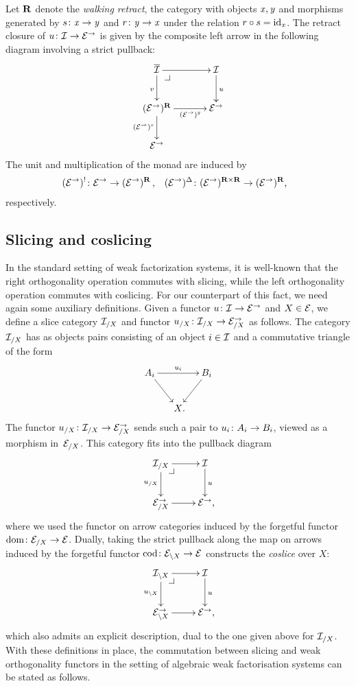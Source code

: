 \documentclass[reqno,10pt,a4paper,oneside,draft]{amsart}
\begin{document}
\begin{remark}
Let $\ret$ denote the \emph{walking retract}, \ie the category with objects $\retA, \retB$ and morphisms generated by $s \co \retA \to \retB$ and $r \co \retB \to \retA$ under the relation $r \cc s = \id_{\retA}$.
The retract closure of $u \co \cal{I} \to \catE^\to$ is given by the composite left arrow in the following diagram involving a strict pullback:
\[
\xymatrix@C+1em{
  \overline{\cal{I}}
  \ar[r]
  \ar[d]_v
  \pullback{dr}
&
  \cal{I}
  \ar[d]^{u}
\\
  (\catE^\to)^{\ret}
  \ar[r]_-{(\catE^\to)^{\retB}}
  \ar[d]_{(\catE^\to)^\retA}
&
  \catE^\to
\\
  \catE^\to
}
\]
The unit and multiplication of the monad are induced by
\[
\begin{aligned}
  (\catE^\to)^{\canonical} &\co \catE^\to \to (\catE^\to)^{\ret}
\, ,&
  (\catE^\to)^{\Delta} &\co (\catE^\to)^{\ret \times \ret} \to (\catE^\to)^{\ret}
\rlap{,}
\end{aligned}
\]
respectively.
\end{remark}

\subsection*{Slicing and coslicing}

In the standard setting of weak factorization systems, it is well-known that the right orthogonality operation commutes with slicing, while the left orthogonality operation commutes with coslicing. For our counterpart of this fact, we need 
again some auxiliary definitions.
Given a functor $u \co \cal{I} \to \catE^\to$ and $X \in \catE$, we define a slice category $\cal{I}_{/X}$ and functor $u_{/X} \co \cal{I}_{/X} \to \catE_{/X}^\to$ as follows.
The category $\cal{I}_{/X}$ has as objects pairs consisting of an object $i \in \cal{I}$ and a commutative triangle of the form
\[
\xymatrix@C-1em{
  A_i
  \ar[dr]
  \ar[rr]^{u_i}
&&
  B_i
  \ar[dl]
\\&
  X
\rlap{.}}
\]
The functor $u_{/X} \co \cal{I}_{/X} \to \catE_{/X}^\to$ sends such a pair to $u_i \co A_i \to B_i$, viewed as a morphism in~$\catE_{/X}$.
This category fits into the pullback diagram
\[
\xymatrix{
  \cal{I}_{/X}
  \ar[r]
  \ar[d]_{u_{/X}}
  \pullback{dr}
&
  \cal{I}
  \ar[d]^{u}
\\
  \catE_{/X}^\to
  \ar[r]
&
  \catE^\to
\rlap{,}}
\]
where we used the functor on arrow categories induced by the forgetful functor $\dom \co \catE_{/X} \to \catE$.
Dually, taking the strict pullback along the map on arrows induced by the forgetful functor $\operatorname{cod} \co \catE_{\backslash X} \to \catE$ constructs the \emph{coslice} over $X$:
\[
\xymatrix{
  \cal{I}_{\backslash X}
  \ar[r]
  \ar[d]_{u_{\backslash X}}
  \pullback{dr}
&
  \cal{I}
  \ar[d]^{u}
\\
  \catE_{\backslash X}^\to
  \ar[r]
&
  \catE^\to
\rlap{,}}
\]
which also admits an explicit description, dual to the one given above for $\cal{I}_{/X}$.
With these definitions in place, the commutation between 
slicing and weak orthogonality functors in the setting of algebraic weak factorisation 
systems can be stated as follows.
\end{document}
